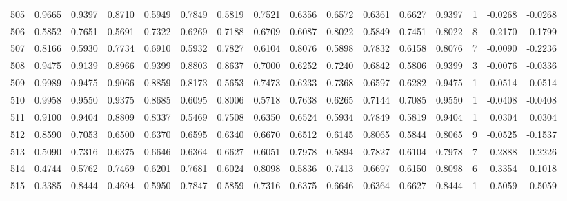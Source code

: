 \begin{tabular}{lrrrrrrrrrrrrrrr}
505 &      0.9665 &  0.9397 &  0.8710 &  0.5949 &  0.7849 &  0.5819 &  0.7521 &  0.6356 &  0.6572 &  0.6361 &   0.6627 &     0.9397 &      1 &                   -0.0268 &                    -0.0268 \\
506 &      0.5852 &  0.7651 &  0.5691 &  0.7322 &  0.6269 &  0.7188 &  0.6709 &  0.6087 &  0.8022 &  0.5849 &   0.7451 &     0.8022 &      8 &                    0.2170 &                     0.1799 \\
507 &      0.8166 &  0.5930 &  0.7734 &  0.6910 &  0.5932 &  0.7827 &  0.6104 &  0.8076 &  0.5898 &  0.7832 &   0.6158 &     0.8076 &      7 &                   -0.0090 &                    -0.2236 \\
508 &      0.9475 &  0.9139 &  0.8966 &  0.9399 &  0.8803 &  0.8637 &  0.7000 &  0.6252 &  0.7240 &  0.6842 &   0.5806 &     0.9399 &      3 &                   -0.0076 &                    -0.0336 \\
509 &      0.9989 &  0.9475 &  0.9066 &  0.8859 &  0.8173 &  0.5653 &  0.7473 &  0.6233 &  0.7368 &  0.6597 &   0.6282 &     0.9475 &      1 &                   -0.0514 &                    -0.0514 \\
510 &      0.9958 &  0.9550 &  0.9375 &  0.8685 &  0.6095 &  0.8006 &  0.5718 &  0.7638 &  0.6265 &  0.7144 &   0.7085 &     0.9550 &      1 &                   -0.0408 &                    -0.0408 \\
511 &      0.9100 &  0.9404 &  0.8809 &  0.8337 &  0.5469 &  0.7508 &  0.6350 &  0.6524 &  0.5934 &  0.7849 &   0.5819 &     0.9404 &      1 &                    0.0304 &                     0.0304 \\
512 &      0.8590 &  0.7053 &  0.6500 &  0.6370 &  0.6595 &  0.6340 &  0.6670 &  0.6512 &  0.6145 &  0.8065 &   0.5844 &     0.8065 &      9 &                   -0.0525 &                    -0.1537 \\
513 &      0.5090 &  0.7316 &  0.6375 &  0.6646 &  0.6364 &  0.6627 &  0.6051 &  0.7978 &  0.5894 &  0.7827 &   0.6104 &     0.7978 &      7 &                    0.2888 &                     0.2226 \\
514 &      0.4744 &  0.5762 &  0.7469 &  0.6201 &  0.7681 &  0.6024 &  0.8098 &  0.5836 &  0.7413 &  0.6697 &   0.6150 &     0.8098 &      6 &                    0.3354 &                     0.1018 \\
515 &      0.3385 &  0.8444 &  0.4694 &  0.5950 &  0.7847 &  0.5859 &  0.7316 &  0.6375 &  0.6646 &  0.6364 &   0.6627 &     0.8444 &      1 &                    0.5059 &                     0.5059 \\

\end{tabular}
